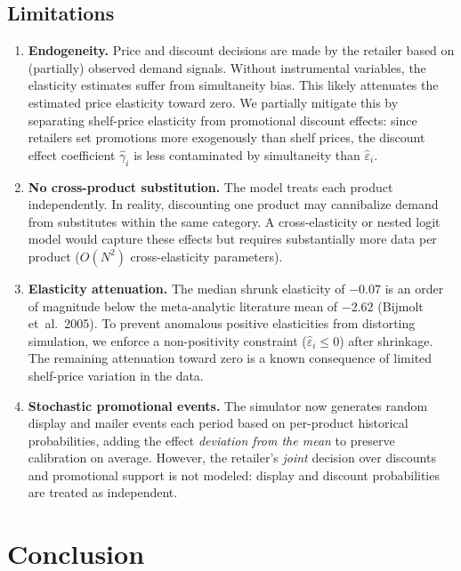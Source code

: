 \documentclass[12pt,a4paper]{article}
\begin{document}
\subsection{Limitations}

\begin{enumerate}[nosep]
\item \textbf{Endogeneity.} Price and discount decisions are made by
the retailer based on (partially) observed demand signals. Without
instrumental variables, the elasticity estimates suffer from
simultaneity bias. This likely attenuates the estimated price
elasticity toward zero. We partially mitigate this by separating
shelf-price elasticity from promotional discount effects:
since retailers set promotions more exogenously than shelf prices,
the discount effect coefficient $\hat{\gamma}_i$ is less
contaminated by simultaneity than $\hat{\varepsilon}_i$.

\item \textbf{No cross-product substitution.} The model treats each
product independently. In reality, discounting one product may
cannibalize demand from substitutes within the same category. A
cross-elasticity or nested logit model would capture these effects
but requires substantially more data per product
($O(N^2)$ cross-elasticity parameters).

\item \textbf{Elasticity attenuation.} The median shrunk elasticity
of $-0.07$ is an order of magnitude below the meta-analytic
literature mean of $-2.62$ (Bijmolt et~al.\ 2005). To prevent
anomalous positive elasticities from distorting simulation,
we enforce a non-positivity constraint ($\hat{\varepsilon}_i
\leq 0$) after shrinkage. The remaining attenuation toward zero
is a known consequence of limited shelf-price variation in the
data.

\item \textbf{Stochastic promotional events.} The simulator now
generates random display and mailer events each period based on
per-product historical probabilities, adding the effect
\emph{deviation from the mean} to preserve calibration on average.
However, the retailer's \emph{joint} decision over discounts and
promotional support is not modeled: display and discount
probabilities are treated as independent.
\end{enumerate}

\section{Conclusion}
\label{sec:conclusion}
\end{document}

